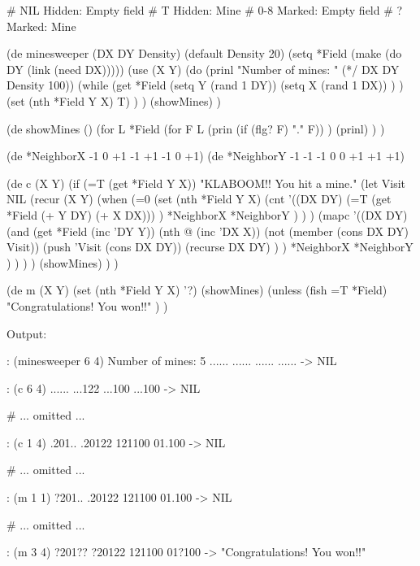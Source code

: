 \begin{wideverbatim}

# NIL    Hidden: Empty field
# T      Hidden: Mine
# 0-8    Marked: Empty field
# ?      Marked: Mine

(de minesweeper (DX DY Density)
   (default Density 20)
   (setq *Field (make (do DY (link (need DX)))))
   (use (X Y)
      (do (prinl "Number of mines: " (*/ DX DY Density 100))
         (while
            (get *Field
               (setq Y (rand 1 DY))
               (setq X (rand 1 DX)) ) )
         (set (nth *Field Y X) T) ) )
   (showMines) )

(de showMines ()
   (for L *Field
      (for F L
         (prin (if (flg? F) "." F)) )
      (prinl) ) )

(de *NeighborX -1  0 +1 -1  +1 -1  0 +1)
(de *NeighborY -1 -1 -1  0   0 +1 +1 +1)

(de c (X Y)
   (if (=T (get *Field Y X))
      "KLABOOM!! You hit a mine."
      (let Visit NIL
         (recur (X Y)
            (when
               (=0
                  (set (nth *Field Y X)
                     (cnt
                        '((DX DY)
                           (=T (get *Field (+ Y DY) (+ X DX))) )
                        *NeighborX
                        *NeighborY ) ) )
               (mapc
                  '((DX DY)
                     (and
                        (get *Field (inc 'DY Y))
                        (nth @ (inc 'DX X))
                        (not (member (cons DX DY) Visit))
                        (push 'Visit (cons DX DY))
                        (recurse DX DY) ) )
                  *NeighborX
                  *NeighborY ) ) ) )
      (showMines) ) )

(de m (X Y)
   (set (nth *Field Y X) '?)
   (showMines)
   (unless (fish =T *Field)
      "Congratulations! You won!!" ) )

\end{wideverbatim}

\begin{wideverbatim}


Output:

: (minesweeper 6 4)
Number of mines: 5
......
......
......
......
-> NIL

: (c 6 4)
......
...122
...100
...100
-> NIL

# ... omitted ...

: (c 1 4)
.201..
.20122
121100
01.100
-> NIL

# ... omitted ...

: (m 1 1)
?201..
.20122
121100
01.100
-> NIL

# ... omitted ...

: (m 3 4)
?201??
?20122
121100
01?100
-> "Congratulations! You won!!"

\end{wideverbatim}

